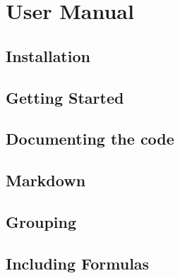 \documentclass{book}
\newcommand{\thisyear}{\the\year}
\begin{document}
\clearemptydoublepage
\tableofcontents
\clearemptydoublepage
{}

\part{User Manual}
\chapter{Installation}\label{install}\hypertarget{install}{}
\chapter{Getting Started}\label{starting}\hypertarget{starting}{}
\chapter{Documenting the code}\label{docblocks}\hypertarget{docblocks}{}
\chapter{Markdown}\label{markdown}\hypertarget{markdown}{}
\chapter{Grouping}\label{grouping}\hypertarget{grouping}{}
\chapter{Including Formulas}\label{formulas}\hypertarget{formulas}{}
\end{document}
